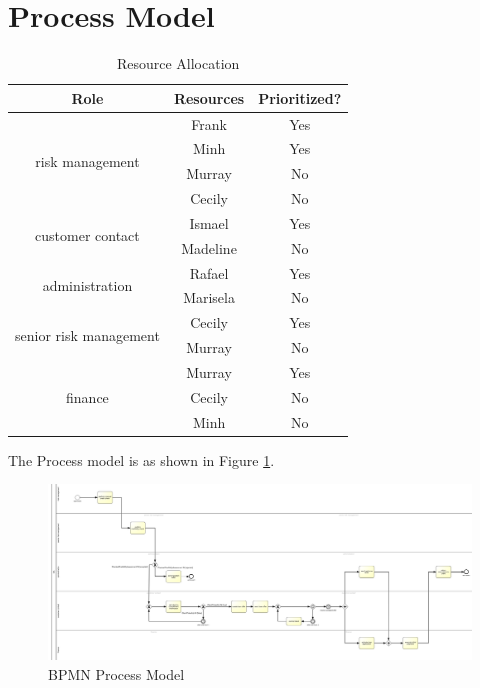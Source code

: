 \documentclass[a4paper]{article} %
\begin{document}
\section{Process Model}
\begin{table}[htbp]
  \centering
  
    \begin{tabular}{|c|c|c|}
    \hline
    \textbf{Role} & \textbf{Resources} & \textbf{Prioritized?} \bigstrut\\
    \hline
    \multirow{4}[8]{*}{risk management} & Frank & Yes \bigstrut\\
\cline{2-3}          & Minh  & Yes \bigstrut\\
\cline{2-3}          & Murray & No \bigstrut\\
\cline{2-3}          & Cecily & No \bigstrut\\
    \hline
    \multirow{2}[4]{*}{customer contact} & Ismael & Yes \bigstrut\\
\cline{2-3}          & Madeline & No \bigstrut\\
    \hline
    \multirow{2}[4]{*}{administration} & Rafael & Yes \bigstrut\\
\cline{2-3}          & Marisela & No \bigstrut\\
    \hline
    \multirow{2}[4]{*}{senior risk management} & Cecily & Yes \bigstrut\\
\cline{2-3}          & Murray & No \bigstrut\\
    \hline
    \multirow{3}[6]{*}{finance} & Murray & Yes \bigstrut\\
\cline{2-3}          & Cecily & No \bigstrut\\
\cline{2-3}          & Minh  & No \bigstrut\\
    \hline
    \end{tabular}%
  \label{tab:resource_allocation}%
  \caption{Resource Allocation}
\end{table}%

The Process model is as shown in Figure \ref{BPMNmodel}.
\begin{figure}
\begin{center}
\includegraphics[scale=0.3,frame]{modelx.png}
\caption{BPMN Process Model}

\end{center}
\label{BPMNmodel}
\end{figure}
\end{document}
